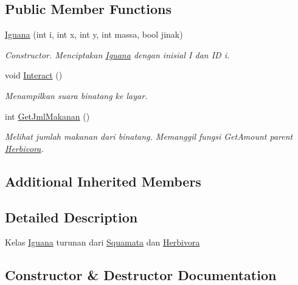 \subsection*{Public Member Functions}
\begin{DoxyCompactItemize}
\item 
\hyperlink{classIguana_a36cea5dad12ace3182deab6fd7ab1b25}{Iguana} (int i, int x, int y, int massa, bool jinak)
\begin{DoxyCompactList}\small\item\em Constructor. Menciptakan \hyperlink{classIguana}{Iguana} dengan inisial \textquotesingle{}I\textquotesingle{} dan ID i. \end{DoxyCompactList}\item 
void \hyperlink{classIguana_aba316410fc6fc8b81bfbde17a733dd0e}{Interact} ()\hypertarget{classIguana_aba316410fc6fc8b81bfbde17a733dd0e}{}\label{classIguana_aba316410fc6fc8b81bfbde17a733dd0e}

\begin{DoxyCompactList}\small\item\em Menampilkan suara binatang ke layar. \end{DoxyCompactList}\item 
int \hyperlink{classIguana_ae871a38dfe31ebba979268ba881cff1a}{Get\+Jml\+Makanan} ()
\begin{DoxyCompactList}\small\item\em Melihat jumlah makanan dari binatang. Memanggil fungsi Get\+Amount parent \hyperlink{classHerbivora}{Herbivora}. \end{DoxyCompactList}\end{DoxyCompactItemize}
\subsection*{Additional Inherited Members}


\subsection{Detailed Description}
Kelas \hyperlink{classIguana}{Iguana} turunan dari \hyperlink{classSquamata}{Squamata} dan \hyperlink{classHerbivora}{Herbivora} 

\subsection{Constructor \& Destructor Documentation}
